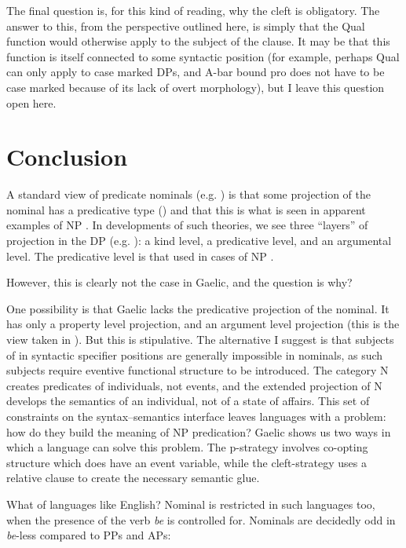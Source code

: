 \documentclass[output=paper]{langsci/langscibook}
\begin{document}
The final question is, for this kind of reading, why the cleft is
obligatory.  The answer to this, from the perspective outlined here, is simply
that the Qual function would otherwise apply to the subject of the clause. It
may be that this function is itself connected to some syntactic position (for
example, perhaps Qual can only apply to case marked DPs, and A-bar bound pro
does not have to be case marked because of its lack of overt morphology), but I
leave this question open here.

\section{Conclusion}

A standard view of predicate nominals (e.g.
\citealt{partee:87,Higginbotham:1987}) is that some projection of the nominal
has a predicative type () and that this is what is seen in apparent
examples of NP . In developments of such theories, we see
three ``layers'' of projection in the DP (e.g. \citealt{zamparelli}): a kind
level, a predicative level, and an argumental level. The predicative level is
that used in cases of NP .

However, this is clearly not the case in Gaelic, and the question is why?

One possibility is that Gaelic lacks the predicative projection of the nominal.
It has only a property level projection, and an argument level projection (this
is the view taken in \citealt{adger-ramchand:03}). But this is stipulative. The
alternative I suggest is that subjects of  in syntactic specifier
positions are generally impossible in nominals, as such subjects require
eventive functional structure to be introduced. The category N creates
predicates of individuals, not events, and the extended projection of N
develops the semantics of an individual, not of a state of affairs. This set of
constraints on the syntax--semantics interface leaves languages with a problem:
how do they build the meaning of NP predication? Gaelic shows us two ways in
which a language can solve this problem. The p-strategy involves co-opting
structure which does have an event variable, while the cleft-strategy uses a
relative clause to create the necessary semantic glue.

What of languages like English? Nominal  is restricted in such
languages too, when the presence of the verb \emph{be} is controlled for.
Nominals are decidedly odd in \emph{be}-less  compared to PPs
and APs:
\end{document}
